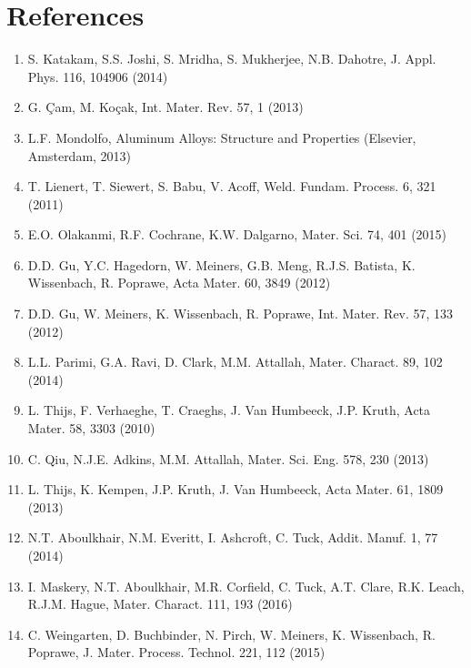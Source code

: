 \documentclass[10pt]{article}
\begin{document}
\section*{References}
\begin{enumerate}
  \item S. Katakam, S.S. Joshi, S. Mridha, S. Mukherjee, N.B. Dahotre, J. Appl. Phys. 116, 104906 (2014)

  \item G. Çam, M. Koçak, Int. Mater. Rev. 57, 1 (2013)

  \item L.F. Mondolfo, Aluminum Alloys: Structure and Properties (Elsevier, Amsterdam, 2013)

  \item T. Lienert, T. Siewert, S. Babu, V. Acoff, Weld. Fundam. Process. 6, 321 (2011)

  \item E.O. Olakanmi, R.F. Cochrane, K.W. Dalgarno, Mater. Sci. 74, 401 (2015)

  \item D.D. Gu, Y.C. Hagedorn, W. Meiners, G.B. Meng, R.J.S. Batista, K. Wissenbach, R. Poprawe, Acta Mater. 60, 3849 (2012)

  \item D.D. Gu, W. Meiners, K. Wissenbach, R. Poprawe, Int. Mater. Rev. 57, 133 (2012)

  \item L.L. Parimi, G.A. Ravi, D. Clark, M.M. Attallah, Mater. Charact. 89, 102 (2014)

  \item L. Thijs, F. Verhaeghe, T. Craeghs, J. Van Humbeeck, J.P. Kruth, Acta Mater. 58, 3303 (2010)

  \item C. Qiu, N.J.E. Adkins, M.M. Attallah, Mater. Sci. Eng. 578, 230 (2013)

  \item L. Thijs, K. Kempen, J.P. Kruth, J. Van Humbeeck, Acta Mater. 61, 1809 (2013)

  \item N.T. Aboulkhair, N.M. Everitt, I. Ashcroft, C. Tuck, Addit. Manuf. 1, 77 (2014)

  \item I. Maskery, N.T. Aboulkhair, M.R. Corfield, C. Tuck, A.T. Clare, R.K. Leach, R.J.M. Hague, Mater. Charact. 111, 193 (2016)

  \item C. Weingarten, D. Buchbinder, N. Pirch, W. Meiners, K. Wissenbach, R. Poprawe, J. Mater. Process. Technol. 221, 112 (2015)


\end{enumerate}
\end{document}
